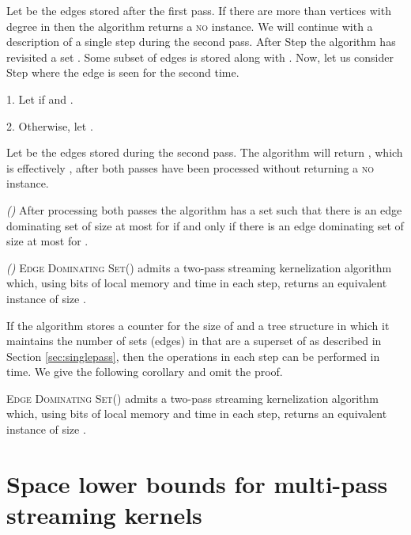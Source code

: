 \documentclass[draft,a4paper]{llncs}
\newcommand{\no}{\textsc{no}\xspace}
\newcommand{\EDSk}{\textsc{Edge Dominating Set()}\xspace}
\begin{document}
Let  be the edges stored after the first pass. If there are more than  vertices with degree  in  then the algorithm returns a \no instance. We will continue with a description of a single step during the second pass. 
After Step  the algorithm has revisited a set . Some subset  of edges is stored along with
. Now, let us consider Step  where the edge  is seen for the second time.

\smallskip

 1. Let  if  and .
 
 2. Otherwise, let .
 
 \smallskip

\noindent Let  be the edges stored during the second pass. The algorithm will return , which is effectively , after both passes have been 
processed without returning a \no instance.

\begin{lemma}\label{lem:eds} \emph{()}
 After processing both passes the algorithm has a set  such that there is an edge dominating set 
  of size at most  for  if and only if there is an edge dominating set  of size at most  for .
\end{lemma}

\begin{theorem} \label{thm:2pass} \emph{()}
 \EDSk admits a two-pass streaming kernelization algorithm which, using  bits of local memory and
  time in each step, returns an equivalent instance of size .
\end{theorem}
  
If the algorithm stores a counter for the size of  and a tree structure  in which it maintains the number of sets (edges) in  that are a superset of  as described in Section \ref{sec:singlepass}, then the operations in each step can be performed in  time. We give the following corollary and omit the proof.

\begin{corollary}
 \EDSk admits a two-pass streaming kernelization algorithm which, using  bits of local memory and  time in each step, returns an equivalent instance of size .
\end{corollary}


\section{Space lower bounds for multi-pass streaming kernels}\label{sec:multi}
\end{document}
